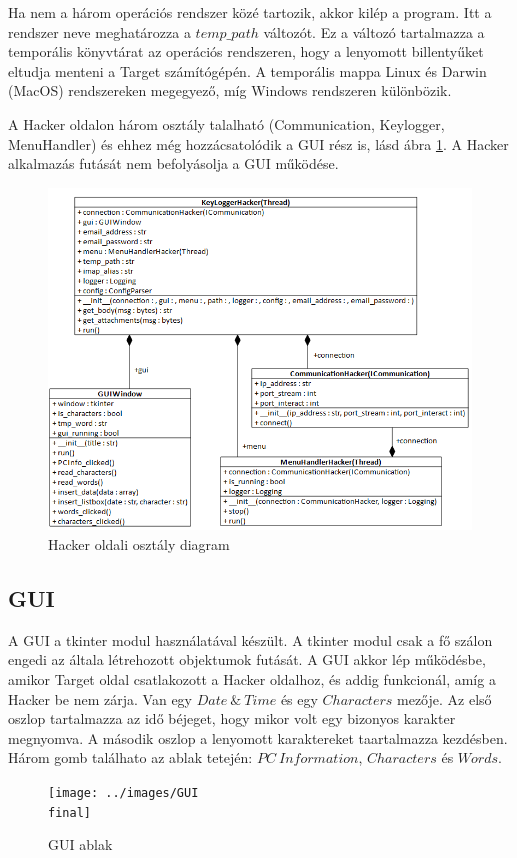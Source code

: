 \documentclass[12pt,a4paper,oneside]{report}
\begin{document}


Ha nem a három operációs rendszer közé tartozik, akkor kilép a program. Itt a rendszer neve meghatározza a $temp\_path$ változót. Ez a változó tartalmazza a temporális könyvtárat az operációs rendszeren, hogy a lenyomott billentyűket eltudja menteni a Target számítógépén. A temporális mappa Linux és Darwin (MacOS) rendszereken megegyező, míg Windows rendszeren különbözik.

A Hacker oldalon három osztály talalható (Communication, Keylogger, MenuHandler) és ehhez még hozzácsatolódik a GUI rész is, lásd ábra \ref{fig:serverclassdia}. A Hacker alkalmazás futását nem befolyásolja a GUI működése.
\begin{figure}[H]
\centering
\includegraphics[width=400pt]{../images/hackerclassdiagram}
\caption{Hacker oldali osztály diagram}
\label{fig:serverclassdia}
\end{figure}

\subsection{GUI}\label{subsubsec:gui}
A GUI a tkinter modul használatával készült. A tkinter modul csak a fő szálon engedi az általa létrehozott objektumok futását.
A GUI akkor lép működésbe, amikor Target oldal csatlakozott a Hacker oldalhoz, és addig funkcionál, amíg a Hacker be nem zárja. Van egy $Date\ \&\ Time$ és egy $Characters$ mezője. Az első oszlop tartalmazza az idő béjeget, hogy mikor volt egy bizonyos karakter megnyomva. A második oszlop a lenyomott karaktereket taartalmazza kezdésben. Három gomb találhato az ablak tetején: $PC\ Information$, $Characters$ és $Words$.
\begin{figure}[H]
\centering
\texttt{[image: ../images/GUI\\ final]}
\caption{GUI ablak}
\label{fig:gui}
\end{figure}
\end{document}
